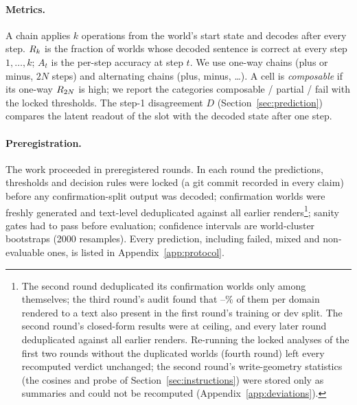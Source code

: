 \paragraph{Metrics.}
A chain applies $k$ operations from the world's start state and decodes after every step. $R_{k}$ is the fraction of worlds whose
decoded sentence is correct at every step $1,\dots,k$; $A_t$ is the per-step accuracy at step $t$. We use one-way chains (plus or minus,
$2N$ steps) and alternating chains (plus, minus, \dots). A cell is \emph{composable} if its one-way $R_{2N}$ is high; we report the
categories composable / partial / fail with the locked thresholds. The step-1 disagreement $D$ (Section~\ref{sec:prediction}) compares
the latent readout of the slot with the decoded state after one step.

\paragraph{Preregistration.}
The work proceeded in \CLmetaRounds{} preregistered rounds. In each round the predictions, thresholds and decision rules were locked (a git commit
recorded in every claim) before any confirmation-split output was decoded; confirmation worlds were freshly generated and text-level
deduplicated against all earlier renders\footnote{The second round deduplicated its confirmation worlds only among themselves; the third round's audit found that \CLmetaReuseMin{}--\CLmetaReuseMax{}\% of them per domain rendered to a text also present in the first round's training or dev split. The second round's closed-form results were at ceiling, and every later round deduplicated against all earlier renders. Re-running the locked analyses of the first two rounds without the
duplicated worlds (fourth round) left every recomputed verdict unchanged; the second round's write-geometry statistics (the cosines
and probe of Section~\ref{sec:instructions}) were stored only as summaries and could not be recomputed (Appendix~\ref{app:deviations}).};
sanity gates had to pass before evaluation; confidence intervals are world-cluster bootstraps (2000 resamples). Every prediction,
including failed, mixed and non-evaluable ones, is listed in Appendix~\ref{app:protocol}.

